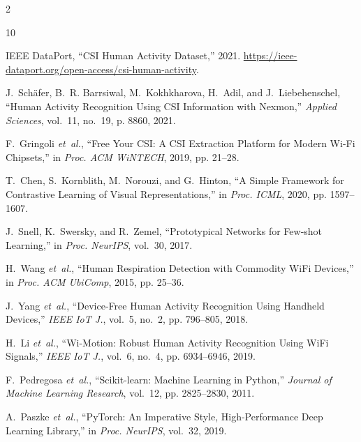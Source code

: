\documentclass[10pt,a4paper]{article}
\begin{document}

\begin{multicols}{2}
\scriptsize
\begin{thebibliography}{10}
\setlength{\itemsep}{1pt}
\setlength{\parskip}{0pt}

IEEE DataPort, ``CSI Human Activity Dataset,'' 2021. \url{https://ieee-dataport.org/open-access/csi-human-activity}.

J.~Sch{\"a}fer, B.~R. Barrsiwal, M.~Kokhkharova, H.~Adil, and J.~Liebehenschel, ``Human Activity Recognition Using CSI Information with Nexmon,'' \emph{Applied Sciences}, vol.~11, no.~19, p. 8860, 2021.

F.~Gringoli \emph{et~al.}, ``Free Your CSI: A CSI Extraction Platform for Modern Wi-Fi Chipsets,'' in \emph{Proc. ACM WiNTECH}, 2019, pp. 21--28.

T.~Chen, S.~Kornblith, M.~Norouzi, and G.~Hinton, ``A Simple Framework for Contrastive Learning of Visual Representations,'' in \emph{Proc. ICML}, 2020, pp. 1597--1607.

J.~Snell, K.~Swersky, and R.~Zemel, ``Prototypical Networks for Few-shot Learning,'' in \emph{Proc. NeurIPS}, vol.~30, 2017.

H.~Wang \emph{et~al.}, ``Human Respiration Detection with Commodity WiFi Devices,'' in \emph{Proc. ACM UbiComp}, 2015, pp. 25--36.

J.~Yang \emph{et~al.}, ``Device-Free Human Activity Recognition Using Handheld Devices,'' \emph{IEEE IoT J.}, vol.~5, no.~2, pp. 796--805, 2018.

H.~Li \emph{et~al.}, ``Wi-Motion: Robust Human Activity Recognition Using WiFi Signals,'' \emph{IEEE IoT J.}, vol.~6, no.~4, pp. 6934--6946, 2019.

F.~Pedregosa \emph{et~al.}, ``Scikit-learn: Machine Learning in Python,'' \emph{Journal of Machine Learning Research}, vol.~12, pp. 2825--2830, 2011.

A.~Paszke \emph{et~al.}, ``PyTorch: An Imperative Style, High-Performance Deep Learning Library,'' in \emph{Proc. NeurIPS}, vol.~32, 2019.

\end{thebibliography}
\end{multicols}
\end{document}
